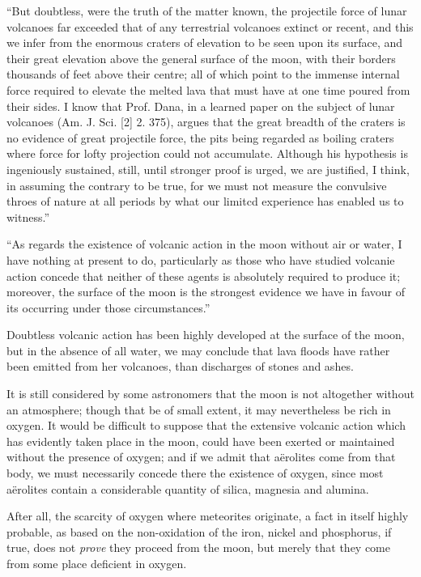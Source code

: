 \documentclass[a4paper, 12pt, oneside]{article}
\begin{document}
``But doubtless, were the truth of the matter known, the projectile force of lunar volcanoes far exceeded that of any terrestrial volcanoes extinct or recent, and this we infer from the enormous craters of elevation to be seen upon its surface, and their great elevation above the general surface of the moon, with their borders thousands of feet above their centre; all of which point to the immense internal force required to elevate the melted lava that must have at one time poured from their sides. I know that Prof. Dana, in a learned paper on the subject of lunar volcanoes (Am. J. Sci. [2] 2. 375), argues that the great breadth of the craters is no evidence of great projectile force, the pits being regarded as boiling craters where force for lofty projection could not accumulate. Although his hypothesis is ingeniously sustained, still, until stronger proof is urged, we are justified, I think, in assuming the contrary to be true, for we must not measure the convulsive throes of nature at all periods by what our limitcd experience has enabled us to witness.''

``As regards the existence of volcanic action in the moon without air or water, I have nothing at present to do, particularly as those who have studied volcanie action concede that neither of these agents is absolutely required to produce it; moreover, the surface of the moon is the strongest evidence we have in favour of its occurring under those circumstances.''

Doubtless volcanic action has been highly developed at the surface of the moon, but in the absence of all water, we may conclude that lava floods have rather been emitted from her volcanoes, than discharges of stones and ashes.

It is still considered by some astronomers that the moon is not altogether without an atmosphere; though that be of small extent, it may nevertheless be rich in oxygen. It would be difficult to suppose that the extensive volcanic action which has evidently taken place in the moon, could have been exerted or maintained without the presence of oxygen; and if we admit that aërolites come from that body, we must necessarily concede there the existence of oxygen, since most aërolites contain a considerable quantity of silica, magnesia and alumina.

After all, the scarcity of oxygen where meteorites originate, a fact in itself highly probable, as based on the non-oxidation of the iron, nickel and phosphorus, if true, does not \emph{prove} they proceed from the moon, but merely that they come from some place deficient in oxygen.
\end{document}
